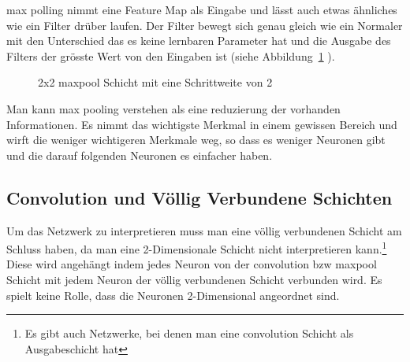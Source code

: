 \documentclass[12pt,a4paper]{report}
\begin{document}
max polling nimmt eine Feature Map als Eingabe und lässt auch etwas ähnliches wie ein Filter drüber laufen.
Der Filter bewegt sich genau gleich wie ein Normaler mit den Unterschied das es keine lernbaren Parameter hat und
die Ausgabe des Filters der grösste Wert von den Eingaben ist (siehe Abbildung~\ref{fig:pool1} ).
\begin{figure}[h]
    \centering
    \caption{2x2 maxpool Schicht mit eine Schrittweite von 2}
    \label{fig:pool1}
\end{figure}
Man kann max pooling verstehen als eine reduzierung der vorhanden Informationen.
Es nimmt das wichtigste Merkmal in einem gewissen Bereich und wirft die weniger wichtigeren Merkmale weg,
so dass es weniger Neuronen gibt und die darauf folgenden Neuronen es einfacher haben.

\subsection{Convolution und Völlig Verbundene Schichten}
Um das Netzwerk zu interpretieren muss man eine völlig verbundenen Schicht am Schluss haben,
da man eine 2-Dimensionale Schicht nicht interpretieren kann.\footnote{Es gibt auch Netzwerke, bei denen man eine convolution Schicht als Ausgabeschicht hat\cite{fullconvolution}}
Diese wird angehängt indem jedes Neuron von der convolution bzw maxpool Schicht mit jedem Neuron der völlig verbundenen Schicht verbunden wird.
Es spielt keine Rolle, dass die Neuronen 2-Dimensional angeordnet sind.
\end{document}
